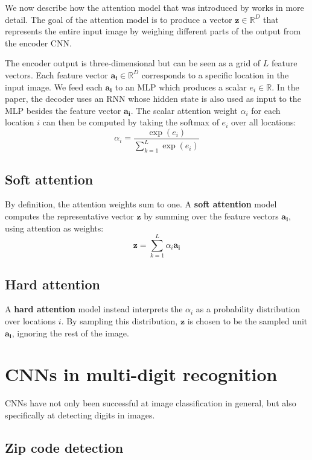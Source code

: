 We now describe how the attention model that was introduced by \textcite{machine_translation_attention} works in more detail.
The goal of the attention model is to produce a vector $\mathbf{z} \in \mathbb{R}^D$ that represents the entire input image by weighing different parts of the output from the encoder CNN.

The encoder output is three-dimensional but can be seen as a grid of $L$ feature vectors. Each feature vector $\mathbf{a_i} \in \mathbb{R}^D$ corresponds to a specific location in the input image. We feed each $\mathbf{a_i}$ to an MLP which produces a scalar $e_i \in \mathbb{R}$. In the paper, the decoder uses an RNN whose hidden state is also used as input to the MLP besides the feature vector $\mathbf{a_i}$.
The scalar attention weight $\alpha_i$ for each location $i$ can then be computed by taking the softmax of $e_i$ over all locations:
\[
\alpha_i = \frac{ \exp(e_i) }{ \sum_{k=1}^L \exp(e_i) }
\]

\subsection{Soft attention} \label{sssec:soft_attention}
By definition, the attention weights sum to one. A \textbf{soft attention} model computes the representative vector $\mathbf{z}$ by summing over the feature vectors $\mathbf{a_i}$, using attention as weights:
\[
\mathbf{z} = \sum_{k=1}^L \alpha_i \mathbf{a_i}
\]

\subsection{Hard attention}
A \textbf{hard attention} model instead interprets the ${\alpha_i}$ as a probability distribution over locations $i$. By sampling this distribution, $\mathbf{z}$ is chosen to be the sampled unit $\mathbf{a_i}$, ignoring the rest of the image.


\section{CNNs in multi-digit recognition}

CNNs have not only been successful at image classification in general, but also specifically at detecting digits in images.

\subsection{Zip code detection}

